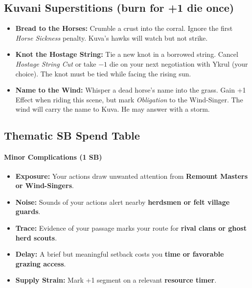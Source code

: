 \subsection*{Kuvani Superstitions (burn for +1 die once)}
\begin{itemize}
  \item \textbf{Bread to the Horses:} Crumble a crust into the corral. Ignore the first \emph{Horse Sickness} penalty. Kuva's hawks will watch but not strike.
  \item \textbf{Knot the Hostage String:} Tie a new knot in a borrowed string. Cancel \emph{Hostage String Cut} or take \(-1\) die on your next negotiation with Ykrul (your choice). The knot must be tied while facing the rising sun.
  \item \textbf{Name to the Wind:} Whisper a dead horse's name into the grass. Gain +1 Effect when riding this scene, but mark \emph{Obligation} to the Wind-Singer. The wind will carry the name to Kuva. He may answer with a storm.
\end{itemize}

\subsection*{Thematic SB Spend Table}
\label{sec:kuvani-sb}

\paragraph{Minor Complications (1 SB)}
\begin{itemize}
\item \textbf{Exposure:} Your actions draw unwanted attention from \textbf{Remount Masters or Wind-Singers}.
\item \textbf{Noise:} Sounds of your actions alert nearby \textbf{herdsmen or felt village guards}.
\item \textbf{Trace:} Evidence of your passage marks your route for \textbf{rival clans or ghost herd scouts}.
\item \textbf{Delay:} A brief but meaningful setback costs you \textbf{time or favorable grazing access}.
\item \textbf{Supply Strain:} Mark +1 segment on a relevant \textbf{resource timer}.
\end{itemize}

